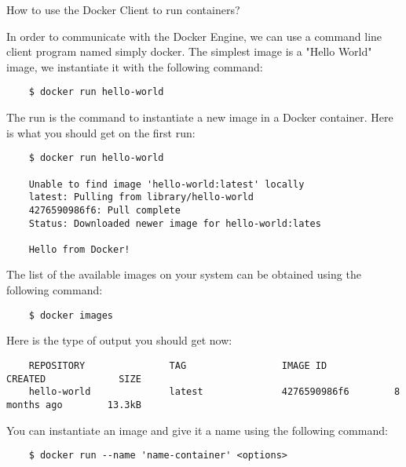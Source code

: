 \documentclass[handout]{beamer}[10pt, usepdftitle=false]
\begin{document}
	\begin{frame}[fragile]
	
	How to use the Docker Client to run containers?
	\vspace*{0.6em}
	
	In order to communicate with the Docker Engine, we can use a command line client program named simply docker. The simplest image is a "Hello World" image, we instantiate it with the following command:
	\begin{verbatim}
	$ docker run hello-world
	\end{verbatim}		
	
	The run is the command to instantiate a new image in a Docker container. Here is what you should get on the first run:
	
	\begin{verbatim}
	$ docker run hello-world

	Unable to find image 'hello-world:latest' locally
	latest: Pulling from library/hello-world
	4276590986f6: Pull complete
	Status: Downloaded newer image for hello-world:lates

	Hello from Docker!
	\end{verbatim}
		
	
	\end{frame}
	\begin{frame}[fragile]
		
	The list of the available images on your system can be obtained using the following command:
	\vspace*{0.6em}	
	
	\begin{verbatim}
	$ docker images
	\end{verbatim}
	
	Here is the type of output you should get now:
	\begingroup
    \fontsize{6pt}{12pt}\selectfont
	\begin{verbatim}
	REPOSITORY               TAG                 IMAGE ID            CREATED             SIZE
	hello-world              latest              4276590986f6        8 months ago        13.3kB	
	\end{verbatim}
	\endgroup

	You can instantiate an image and give it a name using the following command:
	\vspace*{0.6em}
	
	\begin{verbatim}
	$ docker run --name 'name-container' <options>	
	\end{verbatim}
		
	\end{frame}
	
\end{document}
